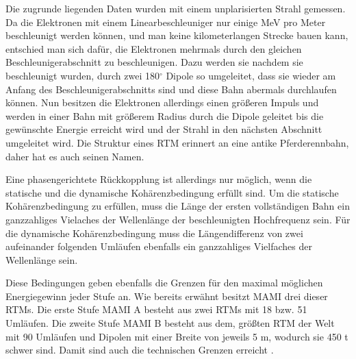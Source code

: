 \documentclass[a4paper,11pt,oneside,final,german,openbib,pdftex]{scrbook}
\begin{document}
{Die zugrunde liegenden Daten wurden mit einem unplarisierten Strahl gemessen.
\newline
Da die Elektronen mit einem Linearbeschleuniger nur einige MeV pro Meter beschleunigt werden k\"onnen, und man keine kilometerlangen Strecke bauen kann, entschied man sich daf\"ur, die Elektronen mehrmals durch den gleichen Beschleunigerabschnitt zu beschleunigen. Dazu werden sie nachdem sie beschleunigt wurden, durch zwei 180$^{\circ}$ Dipole so umgeleitet, dass sie wieder am Anfang des Beschleunigerabschnitts sind und diese Bahn abermals durchlaufen können. Nun besitzen die Elektronen allerdings einen gr\"o{\ss}eren Impuls und werden in einer Bahn mit gr\"o{\ss}erem Radius durch die Dipole geleitet bis die gew\"unschte Energie erreicht wird und der Strahl in den n\"achsten Abschnitt umgeleitet wird. Die Struktur eines RTM erinnert an eine antike Pferderennbahn, daher hat es auch seinen Namen.

 Eine phasengerichtete R\"uckkopplung ist allerdings nur m\"oglich, wenn die statische und die dynamische Koh\"arenzbedingung erf\"ullt sind. Um die statische Koh\"arenzbedingung zu erf\"ullen, muss die L\"ange der ersten vollst\"andigen Bahn ein ganzzahliges Vielaches der Wellenl\"ange der beschleunigten Hochfrequenz sein. F\"ur die dynamische Koh\"arenzbedingung muss die L\"angendifferenz von zwei aufeinander folgenden Uml\"aufen ebenfalls ein ganzzahliges Vielfaches der Wellenl\"ange sein\cite{Un08}. 
 
 Diese Bedingungen geben ebenfalls die Grenzen f\"ur den maximal m\"oglichen Energiegewinn jeder Stufe an. 
\newline
Wie bereits erw\"ahnt besitzt MAMI drei dieser RTMs. Die erste Stufe MAMI A besteht aus zwei RTMs mit 18 bzw. 51 Uml\"aufen. Die zweite Stufe MAMI B besteht aus dem, gr\"o{\ss}ten RTM der Welt mit 90 Uml\"aufen und Dipolen mit einer Breite von jeweils 5 m, wodurch sie 450 t schwer sind. Damit sind auch die technischen Grenzen erreicht \cite{KPh11F}.


}
\end{document}
